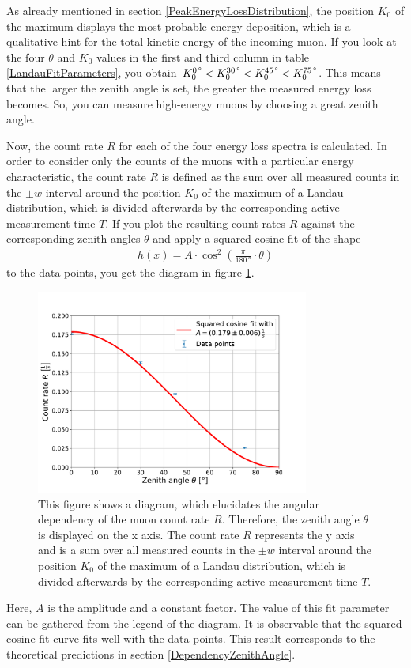 \noindent As already mentioned in section \ref{PeakEnergyLossDistribution}, the position $K_0$ of the maximum displays the most probable energy deposition, which is a qualitative hint for the total kinetic energy of the incoming muon.
If you look at the four $\theta$ and $K_0$ values in the first and third column in table \ref{LandauFitParameters}, you obtain $K_0^\text{0\,°}<K_0^\text{30\,°}<K_0^\text{45\,°}<K_0^\text{75\,°}$.
This means that the larger the zenith angle is set, the greater the measured energy loss becomes.
So, you can measure high-energy muons by choosing a great zenith angle.

Now, the count rate $R$ for each of the four energy loss spectra is calculated.
In order to consider only the counts of the muons with a particular energy characteristic, the count rate $R$ is defined as the sum over all measured counts in the $\pm w$ interval around the position $K_0$ of the maximum of a Landau distribution, which is divided afterwards by the corresponding active measurement time $T$.
If you plot the resulting count rates $R$ against the corresponding zenith angles $\theta$ and apply a squared cosine fit of the shape
\begin{align} \label{KosinusQuadrat}
h(x)=A\cdot\cos^2\left(\frac{\pi}{180\,\text{°}}\cdot\theta\right)
\end{align}
\noindent to the data points, you get the diagram in figure \ref{AngularDependency}.
\begin{figure}[H]
	\centering
	\includegraphics[width=0.8\textwidth]{src/AngularDependency}
	\caption{This figure shows a diagram, which elucidates the angular dependency of the muon count rate $R$. Therefore, the zenith angle $\theta$ is displayed on the x axis. The count rate $R$ represents the y axis and is a sum over all measured counts in the $\pm w$ interval around the position $K_0$ of the maximum of a Landau distribution, which is divided afterwards by the corresponding active measurement time $T$.}
	\label{AngularDependency}
\end{figure}
\noindent Here, $A$ is the amplitude and a constant factor.
The value of this fit parameter can be gathered from the legend of the diagram.
It is observable that the squared cosine fit curve fits well with the data points.
This result corresponds to the theoretical predictions in section \ref{DependencyZenithAngle}.